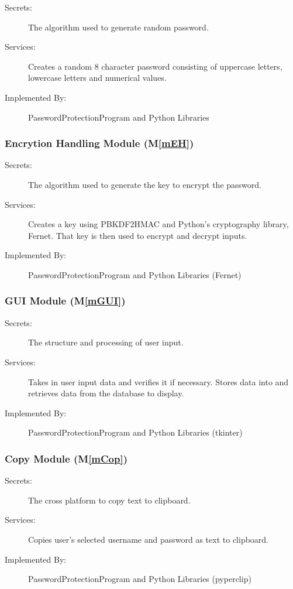 \documentclass[12pt, titlepage]{article}
\newcommand{\mref}[1]{M\ref{#1}}
\begin{document}
\begin{description}
\item[Secrets:] The algorithm used to generate random password.
\item[Services:] Creates a random 8 character password consisting of uppercase letters, lowercase letters and numerical values.
\item[Implemented By:] PasswordProtectionProgram and Python Libraries
\end{description}

\subsubsection{Encrytion Handling Module (\mref{mEH})}

\begin{description}
\item[Secrets:] The algorithm used to generate the key to encrypt the password.
\item[Services:] Creates a key using PBKDF2HMAC and Python's cryptography library, Fernet. That key is then used to encrypt and decrypt inputs.
\item[Implemented By:] PasswordProtectionProgram and Python Libraries (Fernet)
\end{description}

\subsubsection{GUI Module (\mref{mGUI})}

\begin{description}
\item[Secrets:] The structure and processing of user input.
\item[Services:] Takes in user input data and verifies it if necessary. Stores data into and retrieves data from the database to display.
\item[Implemented By:] PasswordProtectionProgram and Python Libraries (tkinter)
\end{description}

\subsubsection{Copy Module (\mref{mCop})}

\begin{description}
\item[Secrets:] The cross platform to copy text to clipboard.
\item[Services:] Copies user's selected username and password as text to clipboard.
\item[Implemented By:] PasswordProtectionProgram and Python Libraries (pyperclip)
\end{description}
\end{document}
